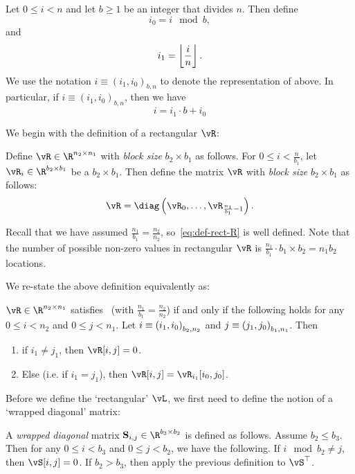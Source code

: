 \begin{definition}\label{def:$i$-rect}
Let $0\le i<n$ and let $b \ge 1$ be an integer that divides $n$. Then define
\[i_0=i\mod{b},\]
and
\[i_1=\left \lfloor \frac in \right \rfloor.\] 
We use the notation $i\equiv (i_1,i_0)_{b,n}$ to denote the representation of  above. In particular, if $i\equiv(i_1,i_0)_{b,n}$,
then we have
\[
        i = i_1 \cdot b + i_0
\]
\end{definition}

We begin with the definition of a rectangular $\vR$:
\begin{definition}
Define $\vR\in\R^{n_2\times n_1}$ with {\em block size} $b_2\times b_1$ as follows. For $0\le i< \frac{n}{b_1}$, let $\vR_{i}\in\R^{b_2 \times b_1}$ be a $b_2 \times b_1$. Then define the matrix $\vR$ with {\em block size} $b_2 \times b_1$ as follows:
\begin{equation}
 \label{eq:def-rect-R}
  \vR = \diag\left(\vR_0, \dots, \vR_{\frac {n_1}{b_1}-1}\right).
\end{equation}
\end{definition}
Recall that we have assumed $\frac {n_1}{b_1}=\frac{n_2}{n_2}$, so~\cref{eq:def-rect-R} is well defined.
Note that the number of possible non-zero values in rectangular $\vR$ is $\frac {n_1}{b_1}\cdot b_1 \times b_2 =n_1b_2$ locations.



We re-state the above definition equivalently as:
\begin{proposition} \label{prop:rect-R-eqv-def} 
$\vR\in\R^{n_2\times n_1}$ satisfies~ (with $\frac {n_1}{b_1}=\frac{n_2}{n_2}$) if and only if the following holds for any
$0\le i < n_2$ and $0\le j< n_1$. Let $i\equiv\left( {{i_1},{i_0}}\right)_{{b_2,n_2}}$ and $j\equiv\left( {{j_1},{j_0}}\right)_{{b_1,n_1}}$.  Then
\begin{enumerate}
    \item\label{item:rect-zero-loc-R} if $i_1\ne j_1$, then $\vR[i,j]=0$. 
    \item \label{item:rect-non-zero-loc-R} Else (i.e. if $i_1=j_1$), then $\vR[i,j]=\vR_{i_1}[i_0,j_0]$.
\end{enumerate}

\end{proposition}

Before we define the `rectangular' $\vL$, we first need to define the notion of a `wrapped diagonal' matrix:
\begin{definition} 
\label{def:wrapped-diag}
A {\em wrapped diagonal} matrix $\mx{S}_{i,j}\in\R^{b_3\times b_2}$ is defined as follows. Assume $b_2\le b_3$. Then for any $0\le i<b_3$ and $0\le j<b_2$, we have the following. If $i\mod{b_2}\ne j$, then $\vS[i,j]=0$. If $b_2>b_3$, then apply the previous definition to $\vS^{\top}$.

\end{definition}


